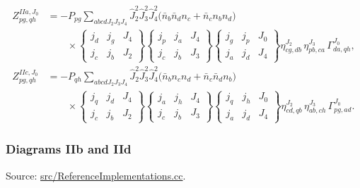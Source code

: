 \documentclass[
]{article}
\begin{document}
\begin{equation}
\begin{aligned}
Z^{IIa,J_0}_{pg,qh}
&=-P_{pg}\sum_{abcdJ_2J_3J_4}
\hat J_2^2\hat J_3^2\hat J_4^2
\Big(\bar n_b\bar n_d n_c+\bar n_c n_b n_d\Big) \\
&\qquad\times
\begin{Bmatrix} j_d&j_g&J_4\\ j_c&j_b&J_2\end{Bmatrix}
\begin{Bmatrix} j_p&j_a&J_4\\ j_c&j_b&J_3\end{Bmatrix}
\begin{Bmatrix} j_g&j_p&J_0\\ j_a&j_d&J_4\end{Bmatrix}
\eta^{J_2}_{cg,db}\,
\eta^{J_3}_{pb,ca}\,
\Gamma^{J_0}_{da,qh},\\
Z^{IIc,J_0}_{pg,qh}
&=-P_{qh}\sum_{abcdJ_2J_3J_4}
\hat J_2^2\hat J_3^2\hat J_4^2
\Big(\bar n_b n_c n_d+\bar n_c\bar n_d n_b\Big) \\
&\qquad\times
\begin{Bmatrix} j_q&j_d&J_4\\ j_c&j_b&J_2\end{Bmatrix}
\begin{Bmatrix} j_a&j_h&J_4\\ j_c&j_b&J_3\end{Bmatrix}
\begin{Bmatrix} j_q&j_h&J_0\\ j_a&j_d&J_4\end{Bmatrix}
\eta^{J_2}_{cd,qb}\,
\eta^{J_3}_{ab,ch}\,
\Gamma^{J_0}_{pg,ad}.
\end{aligned}
\end{equation}

\subsubsection{Diagrams IIb and IId}\label{diagrams-iib-and-iid}

Source:
\href{../src/ReferenceImplementations.cc\#L8140-L8628}{src/ReferenceImplementations.cc}.
\end{document}
